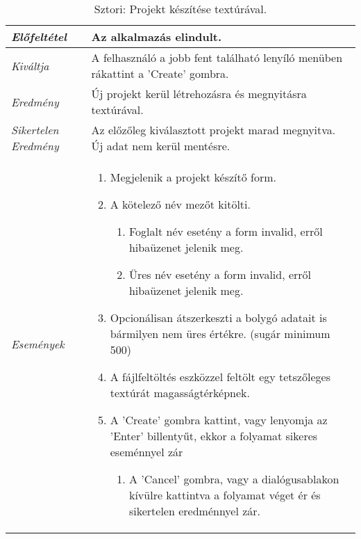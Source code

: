 \begin{table}[H]
	\centering
	\begin{tabular}{ | m{} | m{} | }
		\hline
		\emph{Előfeltétel} & Az alkalmazás elindult.  \\
		\hline
		\emph{Kiváltja} & A felhasználó a jobb fent található lenyíló menüben rákattint a 'Create' gombra. \\
		\hline
		\emph{Eredmény} & Új projekt kerül létrehozásra és megnyitásra textúrával.  \\
		\hline
		\emph{Sikertelen Eredmény} & Az előzőleg kiválasztott projekt marad megnyitva. Új adat nem kerül mentésre.  \\
		\hline
		\hline
		\emph{Események} &

		\begin{enumerate}[itemsep=-1ex]
			\item Megjelenik a projekt készítő form.
			\item A kötelező név mezőt kitölti.
			\begin{enumerate}[itemsep=-1ex]
				\item Foglalt név esetény a form invalid, erről hibaüzenet jelenik meg.
				\item Üres név esetény a form invalid, erről hibaüzenet jelenik meg.
			\end{enumerate}
			\item Opcionálisan átszerkeszti a bolygó adatait is bármilyen nem üres értékre. (sugár minimum 500)
			\item A fájlfeltöltés eszközzel feltölt egy tetszőleges textúrát magasságtérképnek.
			\item A 'Create' gombra kattint, vagy lenyomja az 'Enter' billentyűt, ekkor a folyamat sikeres eseménnyel zár
			\begin{enumerate}[itemsep=-1ex]
				\item A 'Cancel' gombra, vagy a dialógusablakon kívülre kattintva a folyamat véget ér és sikertelen eredménnyel zár.
			\end{enumerate}
		\end{enumerate}

		\\
		\hline
	\end{tabular}
	\caption{Sztori: Projekt készítése textúrával.}
	\label{tab:story-project-create-texture}
\end{table}


